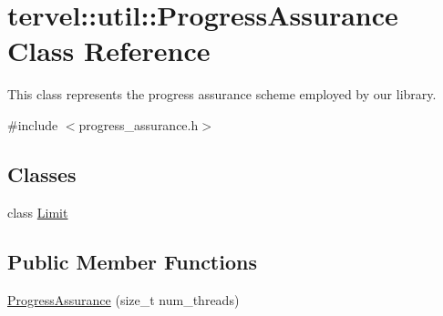 \hypertarget{classtervel_1_1util_1_1_progress_assurance}{}\section{tervel\+:\+:util\+:\+:Progress\+Assurance Class Reference}
\label{classtervel_1_1util_1_1_progress_assurance}


This class represents the progress assurance scheme employed by our library.  




{\ttfamily \#include $<$progress\+\_\+assurance.\+h$>$}

\subsection*{Classes}
\begin{DoxyCompactItemize}
\item 
class \hyperlink{classtervel_1_1util_1_1_progress_assurance_1_1_limit}{Limit}
\end{DoxyCompactItemize}
\subsection*{Public Member Functions}
\begin{DoxyCompactItemize}
\item 
\hyperlink{classtervel_1_1util_1_1_progress_assurance_a4e76edc1f1eb6b0b0111fbd2b5b73cb7}{Progress\+Assurance} (size\+\_\+t num\+\_\+threads)
\end{DoxyCompactItemize}
